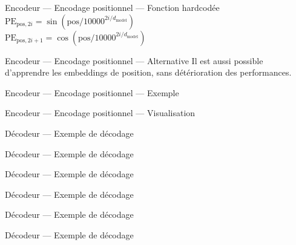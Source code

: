 \begin{frame}{Encodeur --- Encodage positionnel --- Fonction hardcodée}
  $\text{PE}_{\text{pos}, 2i} = \sin{(\text{pos} / 10000^{2i / d_{\text{model}}})}$ \\
  $\text{PE}_{\text{pos}, 2i + 1}= \cos{(\text{pos} / 10000^{2i / d_{\text{model}}})}$
\end{frame}

\begin{frame}{Encodeur --- Encodage positionnel --- Alternative}
  Il est aussi possible d'apprendre les embeddings de position, sans détérioration des performances.
\end{frame}

\begin{frame}{Encodeur --- Encodage positionnel --- Exemple}
\end{frame}

\begin{frame}{Encodeur --- Encodage positionnel --- Visualisation}
\end{frame}

\begin{frame}{Décodeur --- Exemple de décodage}
\end{frame}

\begin{frame}{Décodeur --- Exemple de décodage}
\end{frame}

\begin{frame}{Décodeur --- Exemple de décodage}
\end{frame}

\begin{frame}{Décodeur --- Exemple de décodage}
\end{frame}

\begin{frame}{Décodeur --- Exemple de décodage}
\end{frame}

\begin{frame}{Décodeur --- Exemple de décodage}
\end{frame}

